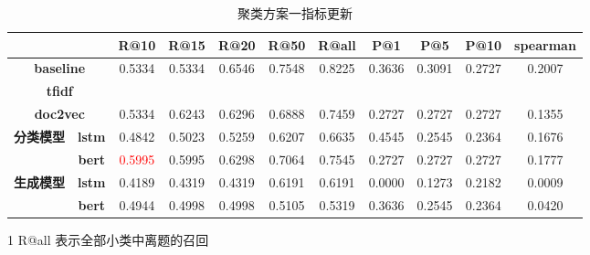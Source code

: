 \documentclass[11pt]{article}
\begin{document}
\begin{CJK}{UTF8}{gkai}
\begin{itemize}
\begin{itemize}
  \end{itemize}
\end{itemize}

\begin{table}[htbp]
  \centering
    \begin{tabular}{c|c|c|c|c|c|c|c|c|c|c}
    \hline
    \multicolumn{2}{c|}{\textcolor[rgb]{ 1,  0,  0}{}} & \textbf{R@10} & \textbf{R@15} & \textbf{R@20} & \textbf{R@50} & \textbf{R@all} & \textbf{P@1} & \textbf{P@5} & \textbf{P@10} & \textbf{spearman} \\
    \hline
    \multicolumn{2}{c|}{\textbf{baseline}} & 0.5334  & 0.5334  & 0.6546  & 0.7548  & 0.8225  & 0.3636  & 0.3091  & 0.2727  & 0.2007  \\
    \hline
    \multicolumn{2}{c|}{\textbf{tfidf}} &       &       &       &       &       &       &       &       &  \\
    \hline
    \multicolumn{2}{c|}{\textbf{doc2vec}} & 0.5334  & 0.6243  & 0.6296  & 0.6888  & 0.7459  & 0.2727  & 0.2727  & 0.2727  & 0.1355  \\
    \hline
    \multirow{2}[0]{*}{\textbf{分类模型}} & \textbf{lstm} & 0.4842  & 0.5023  & 0.5259  & 0.6207  & 0.6635  & 0.4545  & 0.2545  & 0.2364  & 0.1676  \\
    & \textbf{bert} & \textcolor{red}{0.5995}  & 0.5995  & 0.6298  & 0.7064  & 0.7545  & 0.2727  & 0.2727  & 0.2727  & 0.1777  \\
    \hline
    \multirow{2}[0]{*}{\textbf{生成模型}} & \textbf{lstm} & 0.4189  & 0.4319  & 0.4319  & 0.6191  & 0.6191  & 0.0000  & 0.1273  & 0.2182  & 0.0009  \\
    & \textbf{bert} & 0.4944  & 0.4998  & 0.4998  & 0.5105  & 0.5319  & 0.3636  & 0.2545  & 0.2364  & 0.0420  \\
    \hline
    \end{tabular}%
    \begin{tablenotes}    %
      \footnotesize               %
      \item[1] R@all 表示全部小类中离题的召回
    \end{tablenotes} 
    \caption{聚类方案一指标更新}
  \label{tab:addlabel}%
\end{table}%



\end{CJK}
\end{document}

